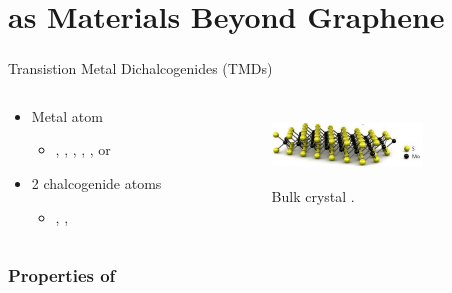 \documentclass{beamer}
\begin{document}
\section{ as Materials Beyond Graphene}
\begin{frame}
\frametitle{}
\begin{center}
Transistion Metal Dichalcogenides (TMDs)
\end{center}

\begin{columns}
	\begin{column}{0.48\textwidth}
		\begin{itemize}
			\item Metal atom 
				\begin{itemize}
					\item {}, , , , , or 
				\end{itemize}
			\item 2 chalcogenide atoms 
				\begin{itemize}
					\item {}, , 
				\end{itemize}
		\end{itemize}
	\end{column}
	\begin{column}{0.48\textwidth}
		\begin{figure}
			\includegraphics[height=2cm,width=4cm]{../present_figs/mos2monolayer}
			\caption{Bulk  crystal \cite{Wang2012}.}
		\end{figure}
	\end{column}
\end{columns}
\end{frame}

\begin{frame}
\frametitle{Properties of }

\end{frame}
\end{document}
